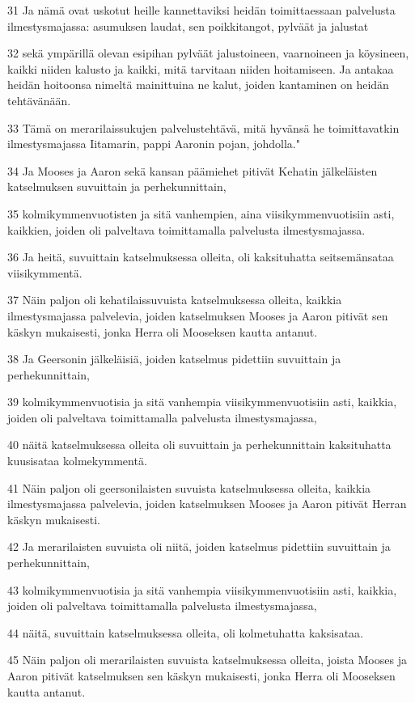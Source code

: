 \par 31 Ja nämä ovat uskotut heille kannettaviksi heidän toimittaessaan palvelusta ilmestysmajassa: asumuksen laudat, sen poikkitangot, pylväät ja jalustat
\par 32 sekä ympärillä olevan esipihan pylväät jalustoineen, vaarnoineen ja köysineen, kaikki niiden kalusto ja kaikki, mitä tarvitaan niiden hoitamiseen. Ja antakaa heidän hoitoonsa nimeltä mainittuina ne kalut, joiden kantaminen on heidän tehtävänään.
\par 33 Tämä on merarilaissukujen palvelustehtävä, mitä hyvänsä he toimittavatkin ilmestysmajassa Iitamarin, pappi Aaronin pojan, johdolla."
\par 34 Ja Mooses ja Aaron sekä kansan päämiehet pitivät Kehatin jälkeläisten katselmuksen suvuittain ja perhekunnittain,
\par 35 kolmikymmenvuotisten ja sitä vanhempien, aina viisikymmenvuotisiin asti, kaikkien, joiden oli palveltava toimittamalla palvelusta ilmestysmajassa.
\par 36 Ja heitä, suvuittain katselmuksessa olleita, oli kaksituhatta seitsemänsataa viisikymmentä.
\par 37 Näin paljon oli kehatilaissuvuista katselmuksessa olleita, kaikkia ilmestysmajassa palvelevia, joiden katselmuksen Mooses ja Aaron pitivät sen käskyn mukaisesti, jonka Herra oli Mooseksen kautta antanut.
\par 38 Ja Geersonin jälkeläisiä, joiden katselmus pidettiin suvuittain ja perhekunnittain,
\par 39 kolmikymmenvuotisia ja sitä vanhempia viisikymmenvuotisiin asti, kaikkia, joiden oli palveltava toimittamalla palvelusta ilmestysmajassa,
\par 40 näitä katselmuksessa olleita oli suvuittain ja perhekunnittain kaksituhatta kuusisataa kolmekymmentä.
\par 41 Näin paljon oli geersonilaisten suvuista katselmuksessa olleita, kaikkia ilmestysmajassa palvelevia, joiden katselmuksen Mooses ja Aaron pitivät Herran käskyn mukaisesti.
\par 42 Ja merarilaisten suvuista oli niitä, joiden katselmus pidettiin suvuittain ja perhekunnittain,
\par 43 kolmikymmenvuotisia ja sitä vanhempia viisikymmenvuotisiin asti, kaikkia, joiden oli palveltava toimittamalla palvelusta ilmestysmajassa,
\par 44 näitä, suvuittain katselmuksessa olleita, oli kolmetuhatta kaksisataa.
\par 45 Näin paljon oli merarilaisten suvuista katselmuksessa olleita, joista Mooses ja Aaron pitivät katselmuksen sen käskyn mukaisesti, jonka Herra oli Mooseksen kautta antanut.
